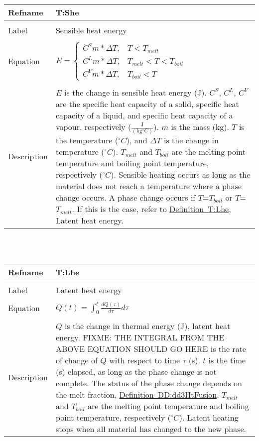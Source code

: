 \documentclass[12pt]{article}
\begin{document}
\noindent \begin{minipage}{\textwidth}
\begin{tabular}{p{} p{}}
\toprule \textbf{Refname} & \textbf{T:She}
\label{T:She}
\\ \midrule \\
Label & Sensible heat energy
\\ \midrule \\
Equation & $E=\begin{cases}
C^{S}m*\Delta{}T, & T<T_{melt}\\
C^{L}m*\Delta{}T, & T_{melt}<T<T_{boil}\\
C^{V}m*\Delta{}T, & T_{boil}<T
\end{cases}$
\\ \midrule \\
Description & $E$ is the change in sensible heat energy (J). $C^{S}$, $C^{L}$, $C^{V}$ are the specific heat capacity of a solid, specific heat capacity of a liquid, and specific heat capacity of a vapour, respectively ($\frac{\text{J}}{(\text{kg}{}^{\circ}C)}$). $m$ is the mass (kg). $T$ is the temperature (${}^{\circ}C$), and $\Delta{}T$ is the change in temperature (${}^{\circ}C$). $T_{melt}$ and $T_{boil}$ are the melting point temperature and boiling point temperature, respectively (${}^{\circ}C$). Sensible heating occurs as long as the material does not reach a temperature where a phase change occurs. A phase change occurs if $T$=$T_{boil}$ or $T$=$T_{melt}$. If this is the case, refer to \hyperref[T:Lhe]{Definition~T:Lhe}, Latent heat energy.
\\ \bottomrule \end{tabular}
\end{minipage}\\
~\newline
\noindent \begin{minipage}{\textwidth}
\begin{tabular}{p{} p{}}
\toprule \textbf{Refname} & \textbf{T:Lhe}
\label{T:Lhe}
\\ \midrule \\
Label & Latent heat energy
\\ \midrule \\
Equation & $Q(t)=\int_{0}^{t}{\frac{dQ(\tau{})}{d\tau{}}d\tau{}}$
\\ \midrule \\
Description & $Q$ is the change in thermal energy (J), latent heat energy. FIXME: THE INTEGRAL FROM THE ABOVE EQUATION SHOULD GO HERE is the rate of change of $Q$ with respect to time $\tau{}$ (s). $t$ is the time (s) elapsed, as long as the phase change is not complete. The status of the phase change depends on the melt fraction, \hyperref[DD:dd3HtFusion]{Definition~DD:dd3HtFusion}. $T_{melt}$ and $T_{boil}$ are the melting point temperature and boiling point temperature, respectively (${}^{\circ}C$). Latent heating stops when all material has changed to the new phase.
\\ \bottomrule \end{tabular}
\end{minipage}\\
\end{document}
